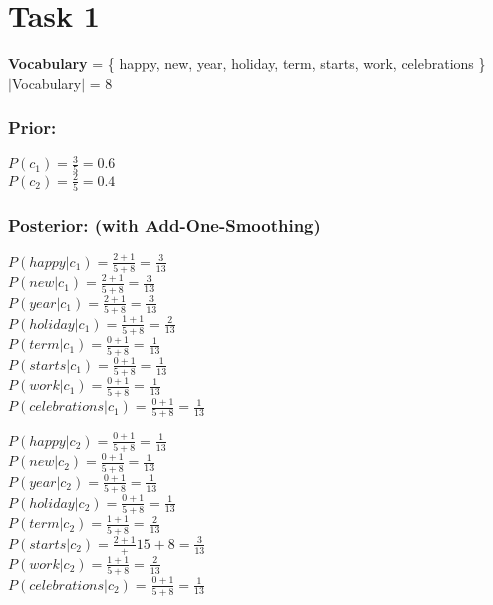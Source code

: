 \documentclass[a4paper]{scrartcl}
\begin{document}
    
\section*{Task 1}
\textbf{Vocabulary} = \{ happy, new, year, holiday, term, starts, work, celebrations \}\\
$|$Vocabulary$|$ = 8

\subsubsection*{Prior:}
    $P(c_1) = \frac{3}{5} = 0.6$\\
    $P(c_2) = \frac{2}{5} = 0.4$ 

\subsubsection*{Posterior: (with Add-One-Smoothing)}
\begin{multicols}{2}
    $P(happy|c_1) = \frac{2 + 1}{5 + 8} = \frac{3}{13}$\\
    $P(new|c_1) = \frac{2 + 1}{5 + 8} = \frac{3}{13}$\\
    $P(year|c_1) = \frac{2 + 1}{5 + 8} = \frac{3}{13}$\\
    $P(holiday|c_1) = \frac{1 + 1}{5 + 8} = \frac{2}{13}$\\
    $P(term|c_1) = \frac{0 + 1}{5 + 8} = \frac{1}{13}$\\
    $P(starts|c_1) = \frac{0 + 1}{5 + 8} = \frac{1}{13}$\\
    $P(work|c_1) = \frac{0 + 1}{5 + 8} = \frac{1}{13}$\\
    $P(celebrations|c_1) = \frac{0 + 1}{5 + 8} = \frac{1}{13}$

    $P(happy|c_2) = \frac{0 + 1}{5 + 8} = \frac{1}{13}$\\
    $P(new|c_2) = \frac{0 + 1}{5 + 8} = \frac{1}{13}$\\
    $P(year|c_2) = \frac{0 + 1}{5 + 8} = \frac{1}{13}$\\
    $P(holiday|c_2) = \frac{0 + 1}{5 + 8} = \frac{1}{13}$\\
    $P(term|c_2) = \frac{1 + 1}{5 + 8} = \frac{2}{13}$\\
    $P(starts|c_2) = \frac{2 + 1} + 1{5 + 8} = \frac{3}{13}$\\
    $P(work|c_2) = \frac{1 + 1}{5 + 8} = \frac{2}{13}$\\
    $P(celebrations|c_2) = \frac{0 + 1}{5 + 8} = \frac{1}{13}$
\end{multicols}
\end{document}
